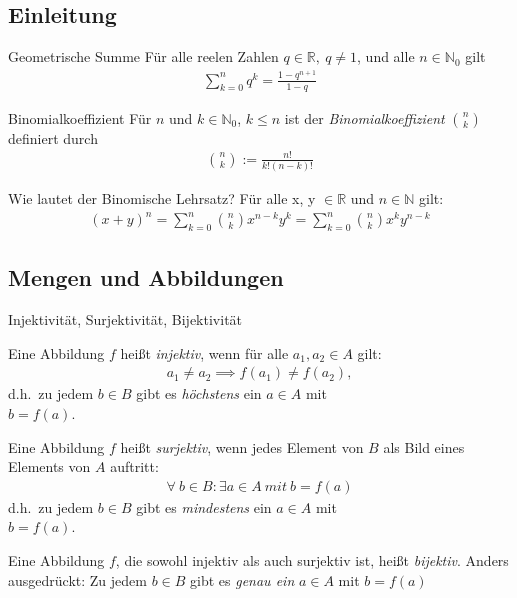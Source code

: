 \subsection{Einleitung}
\begin{karte}{Geometrische Summe}
	Für alle reelen Zahlen \(q \in \mathbb{R},\ q\neq1\), und alle \(n \in \mathbb{N}_0\) gilt
	\begin{align}
		\sum_{k=0}^{n} q^k = \frac{1-q^{n+1}}{1-q}
	\end{align}
\end{karte}

\begin{karte}{Binomialkoeffizient}
	Für \(n\) und \(k \in \mathbb{N}_0\), \( k \leq n\) ist der \emph{Binomialkoeffizient} \(\binom{n}{k}\) definiert durch
	\begin{align}
		\binom{n}{k} := \frac{n!}{k!(n-k)!}
	\end{align}
\end{karte}

\begin{karte}{Wie lautet der Binomische Lehrsatz?}
	Für alle x, y \(\in \mathbb{R}\) und \(n \in \mathbb{N}\) gilt:
	\begin{align}
		{(x + y)}^n = \sum_{k=0}^{n}\binom{n}{k} x^{n-k}y^k=\sum_{k=0}^{n}\binom{n}{k} x^{k}y^{n-k}
	\end{align}
\end{karte}

\subsection{Mengen und Abbildungen}


\begin{karte}{Injektivität, Surjektivität, Bijektivität}
	{\large
		Eine Abbildung \(f\) heißt \emph{injektiv}, wenn für alle \(a_1,a_2 \in A\) gilt:
		\begin{align}
			a_1 \neq a_2 \implies f(a_1) \neq f(a_2),
		\end{align}
		d.h.\ zu jedem $b\in B$ gibt es \emph{höchstens} ein $a\in A$ mit\\ $b=f(a)$.

		Eine Abbildung \(f\) heißt \emph{surjektiv}, wenn jedes Element von \(B\)  als Bild eines Elements von $A$ auftritt:
		\begin{align}
			\forall \ b \in B: \exists a\in A \ mit \ b=f(a)
		\end{align}
		d.h.\ zu jedem \(b\in B\) gibt es \emph{mindestens} ein \(a\in A\) mit\\ \(b=f(a)\).

		Eine Abbildung \(f\), die sowohl injektiv als auch surjektiv ist, heißt \emph{bijektiv}. Anders ausgedrückt: Zu jedem \(b \in B\) gibt es \emph{genau ein} \(a \in A\) mit \(b=f(a)\)
	}
\end{karte}
